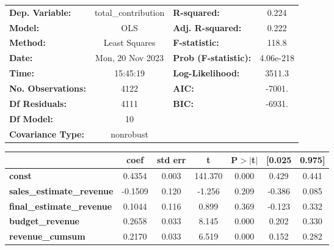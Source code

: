 \begin{center}
\begin{tabular}{lclc}
\toprule
\textbf{Dep. Variable:}                & total\_contribution & \textbf{  R-squared:         } &     0.224   \\
\textbf{Model:}                        &         OLS         & \textbf{  Adj. R-squared:    } &     0.222   \\
\textbf{Method:}                       &    Least Squares    & \textbf{  F-statistic:       } &     118.8   \\
\textbf{Date:}                         &   Mon, 20 Nov 2023  & \textbf{  Prob (F-statistic):} & 4.06e-218   \\
\textbf{Time:}                         &       15:45:19      & \textbf{  Log-Likelihood:    } &    3511.3   \\
\textbf{No. Observations:}             &          4122       & \textbf{  AIC:               } &    -7001.   \\
\textbf{Df Residuals:}                 &          4111       & \textbf{  BIC:               } &    -6931.   \\
\textbf{Df Model:}                     &            10       & \textbf{                     } &             \\
\textbf{Covariance Type:}              &      nonrobust      & \textbf{                     } &             \\
\bottomrule
\end{tabular}
\begin{tabular}{lcccccc}
                                       & \textbf{coef} & \textbf{std err} & \textbf{t} & \textbf{P$> |$t$|$} & \textbf{[0.025} & \textbf{0.975]}  \\
\midrule
\textbf{const}                         &       0.4354  &        0.003     &   141.370  &         0.000        &        0.429    &        0.441     \\
\textbf{sales\_estimate\_revenue}      &      -0.1509  &        0.120     &    -1.256  &         0.209        &       -0.386    &        0.085     \\
\textbf{final\_estimate\_revenue}      &       0.1044  &        0.116     &     0.899  &         0.369        &       -0.123    &        0.332     \\
\textbf{budget\_revenue}               &       0.2658  &        0.033     &     8.145  &         0.000        &        0.202    &        0.330     \\
\textbf{revenue\_cumsum}               &       0.2170  &        0.033     &     6.519  &         0.000        &        0.152    &        0.282     \\

\end{tabular}
\end{center}
